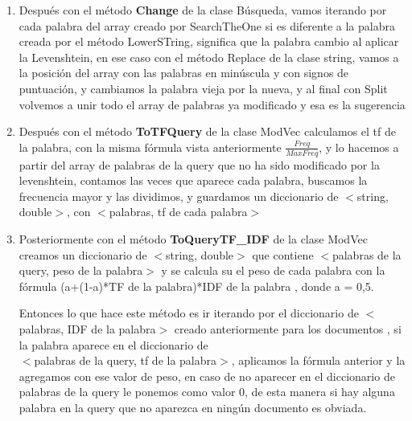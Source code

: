 \documentclass[12pt, a4paper]{article}
\begin{document}
\begin{enumerate}
\begin{itemize}
                        \end{itemize}
                  \item Después con el método \textbf{Change} de la clase Búsqueda,
                        vamos iterando por cada palabra del array creado por SearchTheOne si es diferente
                        a la palabra creada por el método LowerSTring, significa que la palabra
                        cambio al aplicar la Levenshtein, en ese caso con el método Replace de la clase
                        string, vamos a la posición del array con las palabras en minúscula y
                        con signos de puntuación, y cambiamos la palabra vieja por la nueva, y al final
                        con Split volvemos a unir todo el array de palabras ya modificado y esa es la
                        sugerencia
                  \item Después con el método \textbf{ToTFQuery} de la clase ModVec calculamos el
                        tf de la palabra, con la misma fórmula vista anteriormente $\frac{Freq}{MaxFreq}$,
                        y lo hacemos a partir del array de palabras de la query que no ha
                        sido modificado por la levenshtein, contamos las veces que aparece
                        cada palabra, buscamos la frecuencia mayor y las dividimos,
                        y guardamos un diccionario de $<$string, double$>$,
                        con $<$palabras, tf de cada palabra$>$
                  \item Posteriormente con el método \textbf{ToQueryTF\_IDF} de la clase ModVec
                        creamos un diccionario de $<$string, double$>$ que contiene
                        $<$palabras de la query, peso de la palabra$>$ y se calcula su el peso de
                        cada palabra con la fórmula
                        (a+(1-a)*TF de la palabra)*IDF de la palabra , donde a = 0,5.
                        
                        Entonces lo que hace este método es ir iterando por el diccionario de
                        $<$palabras, IDF de la palabra$>$ creado anteriormente para los documentos ,
                        si la palabra aparece en el diccionario de\\
                        $<$palabras de la query, tf de la palabra$>$,
                        aplicamos la fórmula anterior y la agregamos con ese valor de peso, en caso de no aparecer
                        en el diccionario de palabras de la query le ponemos como valor 0, de esta manera
                        si hay alguna palabra en la query que no aparezca en ningún documento es obviada.\\
                        
                        \end{enumerate}
\end{document}
